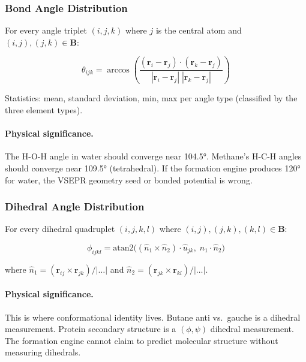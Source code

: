 \documentclass[11pt, a4paper, oneside]{article}
\theoremstyle{definition}
\theoremstyle{remark}
\begin{document}
\subsubsection{Bond Angle Distribution}

For every angle triplet $(i, j, k)$ where $j$ is the central atom and
$(i,j), (j,k) \in \mathbf{B}$:

\begin{equation}
\theta_{ijk} = \arccos\left(
  \frac{(\mathbf{r}_i - \mathbf{r}_j) \cdot (\mathbf{r}_k - \mathbf{r}_j)}
       {|\mathbf{r}_i - \mathbf{r}_j| \; |\mathbf{r}_k - \mathbf{r}_j|}
\right)
\end{equation}

Statistics: mean, standard deviation, min, max per angle type
(classified by the three element types).

\paragraph{Physical significance.}
The H-O-H angle in water should converge near 104.5°.  Methane's
H-C-H angles should converge near 109.5° (tetrahedral).  If the
formation engine produces 120° for water, the VSEPR geometry seed or
bonded potential is wrong.

\subsubsection{Dihedral Angle Distribution}

For every dihedral quadruplet $(i,j,k,l)$ where $(i,j), (j,k), (k,l) \in \mathbf{B}$:

\begin{equation}
\phi_{ijkl} = \text{atan2}\bigl(
  (\hat{n}_1 \times \hat{n}_2) \cdot \hat{u}_{jk},\;
  \hat{n}_1 \cdot \hat{n}_2
\bigr)
\end{equation}

where $\hat{n}_1 = (\mathbf{r}_{ij} \times \mathbf{r}_{jk})/|\ldots|$
and $\hat{n}_2 = (\mathbf{r}_{jk} \times \mathbf{r}_{kl})/|\ldots|$.

\paragraph{Physical significance.}
This is where conformational identity lives.  Butane anti vs.\ gauche
is a dihedral measurement.  Protein secondary structure is a
$(\phi,\psi)$ dihedral measurement.  The formation engine cannot claim
to predict molecular structure without measuring dihedrals.
\end{document}

